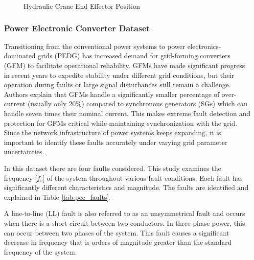 \begin{figure}[H]
    
    \caption{Hydraulic Crane End Effector Position}
    \label{fig:hydraulic_pos}
\end{figure}

\subsubsection{Power Electronic Converter Dataset}
\label{ref_pec_dataset}

Transitioning from the conventional power systems to power electronics-dominated grids (PEDG) has increased demand for grid-forming converters (GFM) to facilitate operational reliability. GFMs have made significant progress in recent years %
to expedite stability under different grid conditions, but their operation during faults or large signal disturbances still remain a challenge. Authors \cite{trainsient-stability-9523750} explain that GFMs handle a significantly smaller percentage of over-current (usually only 20\%) compared to synchronous generators (SGs) which can handle seven times their nominal current. This makes extreme fault detection and protection for GFMs critical while maintaining synchronization with the grid. Since the network infrastructure of power systems keeps expanding, it is important to identify these faults accurately under varying grid parameter uncertainties.


In this dataset there are four faults considered. This study examines the frequency [$f_c$] of the system throughout various fault conditions. Each fault has significantly different characteristics and magnitude. The faults are identified and explained in Table \ref{tab:pec_faults}.



%     

A line-to-line (LL) fault is also referred to as an unsymmetrical fault and occurs when there is a short circuit between two conductors. In three phase power, this can occur between two phases of the system. This fault causes a significant decrease in frequency that is orders of magnitude greater than the standard frequency of the system. 

